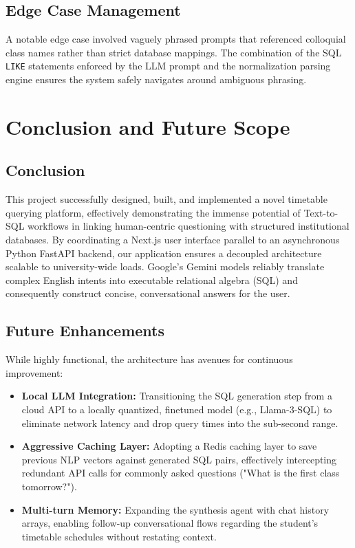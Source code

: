 \documentclass[12pt]{article}
\begin{document}
\subsection{Edge Case Management}
A notable edge case involved vaguely phrased prompts that referenced colloquial class names rather than strict database mappings. The combination of the SQL \texttt{LIKE} statements enforced by the LLM prompt and the normalization parsing engine ensures the system safely navigates around ambiguous phrasing.

\newpage
  
\section{Conclusion and Future Scope}  

\subsection{Conclusion}
This project successfully designed, built, and implemented a novel timetable querying platform, effectively demonstrating the immense potential of Text-to-SQL workflows in linking human-centric questioning with structured institutional databases. By coordinating a Next.js user interface parallel to an asynchronous Python FastAPI backend, our application ensures a decoupled architecture scalable to university-wide loads. Google's Gemini models reliably translate complex English intents into executable relational algebra (SQL) and consequently construct concise, conversational answers for the user.

\subsection{Future Enhancements}
While highly functional, the architecture has avenues for continuous improvement:
\begin{itemize}
    \item \textbf{Local LLM Integration:} Transitioning the SQL generation step from a cloud API to a locally quantized, finetuned model (e.g., Llama-3-SQL) to eliminate network latency and drop query times into the sub-second range.
    \item \textbf{Aggressive Caching Layer:} Adopting a Redis caching layer to save previous NLP vectors against generated SQL pairs, effectively intercepting redundant API calls for commonly asked questions ("What is the first class tomorrow?").
    \item \textbf{Multi-turn Memory:} Expanding the synthesis agent with chat history arrays, enabling follow-up conversational flows regarding the student's timetable schedules without restating context.
\end{itemize}
\end{document}
